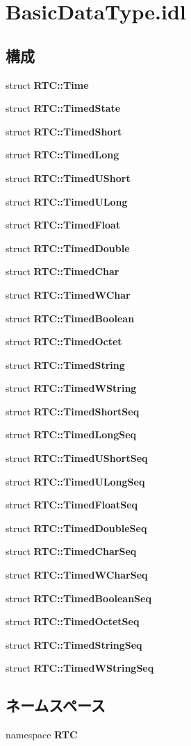 \section{BasicDataType.idl}
\label{BasicDataType_8idl}
\subsection*{構成}
\begin{DoxyCompactItemize}
\item 
struct {\bf RTC::Time}
\item 
struct {\bf RTC::TimedState}
\item 
struct {\bf RTC::TimedShort}
\item 
struct {\bf RTC::TimedLong}
\item 
struct {\bf RTC::TimedUShort}
\item 
struct {\bf RTC::TimedULong}
\item 
struct {\bf RTC::TimedFloat}
\item 
struct {\bf RTC::TimedDouble}
\item 
struct {\bf RTC::TimedChar}
\item 
struct {\bf RTC::TimedWChar}
\item 
struct {\bf RTC::TimedBoolean}
\item 
struct {\bf RTC::TimedOctet}
\item 
struct {\bf RTC::TimedString}
\item 
struct {\bf RTC::TimedWString}
\item 
struct {\bf RTC::TimedShortSeq}
\item 
struct {\bf RTC::TimedLongSeq}
\item 
struct {\bf RTC::TimedUShortSeq}
\item 
struct {\bf RTC::TimedULongSeq}
\item 
struct {\bf RTC::TimedFloatSeq}
\item 
struct {\bf RTC::TimedDoubleSeq}
\item 
struct {\bf RTC::TimedCharSeq}
\item 
struct {\bf RTC::TimedWCharSeq}
\item 
struct {\bf RTC::TimedBooleanSeq}
\item 
struct {\bf RTC::TimedOctetSeq}
\item 
struct {\bf RTC::TimedStringSeq}
\item 
struct {\bf RTC::TimedWStringSeq}
\end{DoxyCompactItemize}
\subsection*{ネームスペース}
\begin{DoxyCompactItemize}
\item 
namespace {\bf RTC}
\end{DoxyCompactItemize}

